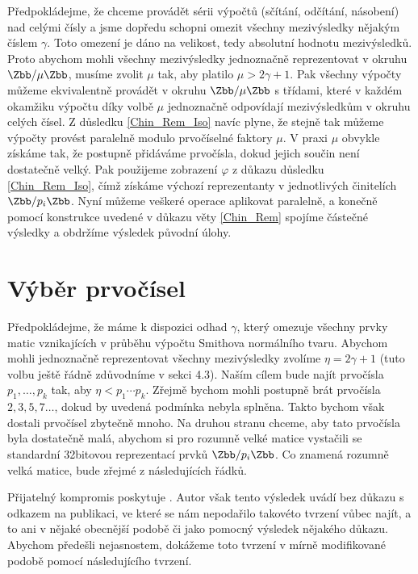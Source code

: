 Předpokládejme, že chceme provádět sérii výpočtů (sčítání, odčítání,
násobení) nad celými čísly a jsme dopředu schopni omezit všechny mezivýsledky 
nějakým číslem $ \gamma $. Toto omezení je dáno na velikost, tedy absolutní 
hodnotu mezivýsledků. Proto abychom mohli všechny mezivýsledky jednoznačně 
reprezentovat v okruhu $ \Zbb / \mu \Zbb $, musíme zvolit $ \mu $ tak, aby 
platilo $ \mu > 2 \gamma + 1 $. Pak všechny výpočty můžeme ekvivalentně provádět 
v okruhu $ \Zbb / \mu \Zbb $ s třídami, které v každém okamžiku výpočtu díky 
volbě $ \mu $ jednoznačně odpovídají mezivýsledkům v okruhu celých čísel.
Z důsledku \ref{Chin_Rem_Iso} navíc plyne, že stejně tak můžeme výpočty provést
paralelně modulo prvočíselné faktory $ \mu $. V praxi $ \mu $ obvykle získáme tak,
že postupně přidáváme prvočísla, dokud jejich součin není dostatečně velký.
Pak použijeme zobrazení $ \varphi $ z důkazu důsledku \ref{Chin_Rem_Iso},
čímž získáme výchozí reprezentanty v jednotlivých činitelích $ \Zbb / p_i \Zbb $.
Nyní můžeme veškeré operace aplikovat paralelně, a konečně pomocí konstrukce 
uvedené v důkazu věty \ref{Chin_Rem} spojíme částečné výsledky a obdržíme 
výsledek původní úlohy.




\section{Výběr prvočísel}
Předpokládejme, že máme k dispozici odhad $ \gamma $, který omezuje všechny
prvky matic vznikajících v průběhu výpočtu Smithova normálního tvaru. 
Abychom mohli jednoznačně reprezentovat všechny mezivýsledky zvolíme 
$ \eta = 2 \gamma + 1 $ (tuto volbu ještě řádně zdůvodníme v sekci 4.3).  
Naším cílem bude najít prvočísla $ p_1,\dots, p_k $ tak, aby 
$ \eta < p_1 \cdots p_k $. Zřejmě
bychom mohli postupně brát prvočísla $ 2, 3, 5, 7 \dots $, dokud by uvedená
podmínka nebyla splněna. Takto bychom však dostali prvočísel zbytečně mnoho. Na
druhou stranu chceme, aby tato prvočísla byla dostatečně malá, abychom
si pro rozumně velké matice vystačili se standardní 32bitovou reprezentací
prvků $ \Zbb / p_i \Zbb $. Co znamená rozumně velká matice, bude zřejmé z 
následujících řádků.

Přijatelný kompromis poskytuje \cite[Lemma 14]{triang}. Autor však tento výsledek
uvádí bez důkazu s odkazem na publikaci, ve které se nám nepodařilo takovéto
tvrzení vůbec najít, a to ani v nějaké obecnější podobě či jako pomocný výsledek
nějakého důkazu. Abychom předešli nejasnostem, dokážeme toto tvrzení v mírně
modifikované podobě pomocí následujícího tvrzení.


